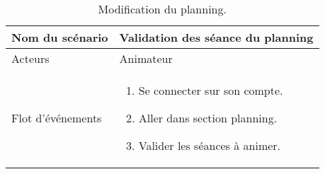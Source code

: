 \documentclass{report}
\begin{document}
\begin{table}[htbp]
\begin{center}
\begin{tabular}{|L{4cm}||L{10cm}|}
\hline Nom du scénario &  Validation des séance du planning \\
\hline  Acteurs &  Animateur \\
\hline  Flot d'événements &  \begin{enumerate}
\item Se connecter sur son compte.
\item Aller dans section planning.
\item Valider les séances à animer.
\end{enumerate}\\
\hline
\end{tabular}
\caption{Modification du planning.\label{creatplan}}
\end{center}
\end{table}
\end{document}

